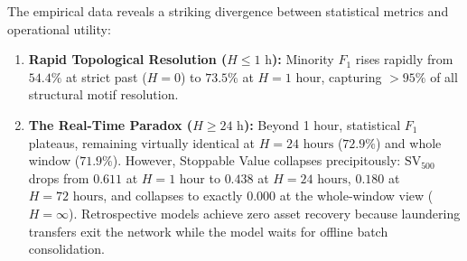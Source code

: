 \documentclass[pdflatex,sn-mathphys,Numbered]{sn-jnl}
\renewenvironment{table*}[1][!htbp]{\begin{tableorg}[#1]\begin{center}\tablebodyfont}{\end{center}\end{tableorg}}
\theoremstyle{thmstyleone}
\theoremstyle{thmstyletwo}
\theoremstyle{thmstylethree}
\begin{document}
\begin{table}[!htbp]
\centering
\small
\caption{\textbf{Decision Horizon Sweep on \texttt{HI-Small} (Released Protocol).}}
\label{tab:horizon_sweep}
\end{table}

The empirical data reveals a striking divergence between statistical metrics and operational utility:
\begin{enumerate}
    \item \textbf{Rapid Topological Resolution ($H \le 1\text{ h}$):} Minority $F_1$ rises rapidly from $54.4\%$ at strict past ($H=0$) to $73.5\%$ at $H=1\text{ hour}$, capturing $>95\%$ of all structural motif resolution.
    \item \textbf{The Real-Time Paradox ($H \ge 24\text{ h}$):} Beyond 1 hour, statistical $F_1$ plateaus, remaining virtually identical at $H=24\text{ hours}$ ($72.9\%$) and whole window ($71.9\%$). However, Stoppable Value collapses precipitously: $\text{SV}_{500}$ drops from $0.611$ at $H=1\text{ hour}$ to $0.438$ at $H=24\text{ hours}$, $0.180$ at $H=72\text{ hours}$, and collapses to exactly \textbf{$0.000$} at the whole-window view ($H=\infty$). Retrospective models achieve zero asset recovery because laundering transfers exit the network while the model waits for offline batch consolidation.
\end{enumerate}
\end{document}
